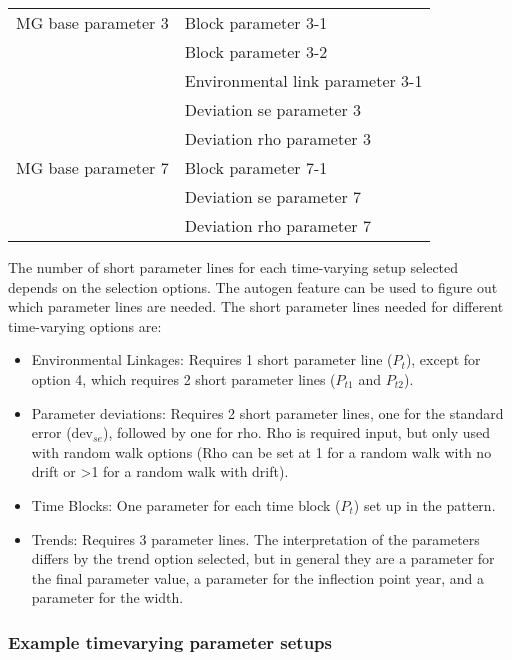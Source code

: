 \begin{center}
	\begin{longtable}{p{5cm} p{10cm}}
		\hline
		MG base parameter 3 & Block parameter 3-1\Tstrut\\
		& Block parameter 3-2\\
		& Environmental link parameter 3-1\\
		& Deviation se parameter 3 \\
		& Deviation rho parameter 3 \Bstrut\\
		MG base parameter 7 & Block parameter 7-1 \\
		& Deviation se parameter 7 \\
		& Deviation rho parameter 7 \Bstrut\\
		\hline	 	                    
		
	\end{longtable}
\end{center}

The number of short parameter lines for each time-varying setup selected depends on the selection options. The autogen feature can be used to figure out which parameter lines are needed. The short parameter lines needed for different time-varying options are:

\begin{itemize}
    \item Environmental Linkages: Requires 1 short parameter line ($P_{t}$), except for option 4, which requires 2 short parameter lines ($P_{t1}$ and $P_{t2}$).
    \item Parameter deviations: Requires 2 short parameter lines, one for the standard error ($\text{dev}_{se}$), followed by one for rho. Rho is required input, but only used with random walk options (Rho can be set at 1 for a random walk with no drift or >1 for a random walk with drift).
    \item Time Blocks: One parameter for each time block ($P_{t}$) set up in the pattern.
    \item Trends: Requires 3 parameter lines. The interpretation of the parameters differs by the trend option selected, but in general they are a parameter for the final parameter value, a parameter for the inflection point year, and a parameter for the width.
\end{itemize}

\subsubsection{Example timevarying parameter setups}

